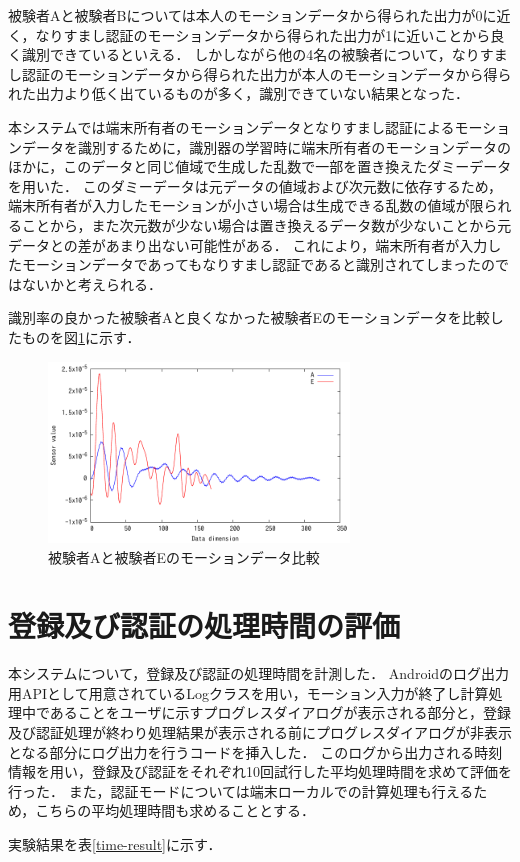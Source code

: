 被験者Aと被験者Bについては本人のモーションデータから得られた出力が0に近く，なりすまし認証のモーションデータから得られた出力が1に近いことから良く識別できているといえる．
しかしながら他の4名の被験者について，なりすまし認証のモーションデータから得られた出力が本人のモーションデータから得られた出力より低く出ているものが多く，識別できていない結果となった．

本システムでは端末所有者のモーションデータとなりすまし認証によるモーションデータを識別するために，識別器の学習時に端末所有者のモーションデータのほかに，このデータと同じ値域で生成した乱数で一部を置き換えたダミーデータを用いた．
このダミーデータは元データの値域および次元数に依存するため，端末所有者が入力したモーションが小さい場合は生成できる乱数の値域が限られることから，また次元数が少ない場合は置き換えるデータ数が少ないことから元データとの差があまり出ない可能性がある．
これにより，端末所有者が入力したモーションデータであってもなりすまし認証であると識別されてしまったのではないかと考えられる．

識別率の良かった被験者Aと良くなかった被験者Eのモーションデータを比較したものを図\ref{compare}に示す．

\begin{figure}[hbtp]
  \centering
  \includegraphics[bb=0 0 360 216, width=8cm]{Graphs/comp.pdf}
  \caption{被験者Aと被験者Eのモーションデータ比較}
  \label{compare}
\end{figure}

\section{登録及び認証の処理時間の評価}
本システムについて，登録及び認証の処理時間を計測した．
Androidのログ出力用APIとして用意されているLogクラス\cite{5-log}を用い，モーション入力が終了し計算処理中であることをユーザに示すプログレスダイアログが表示される部分と，登録及び認証処理が終わり処理結果が表示される前にプログレスダイアログが非表示となる部分にログ出力を行うコードを挿入した．
このログから出力される時刻情報を用い，登録及び認証をそれぞれ10回試行した平均処理時間を求めて評価を行った．
また，認証モードについては端末ローカルでの計算処理も行えるため，こちらの平均処理時間も求めることとする．

実験結果を表\ref{time-result}に示す．
